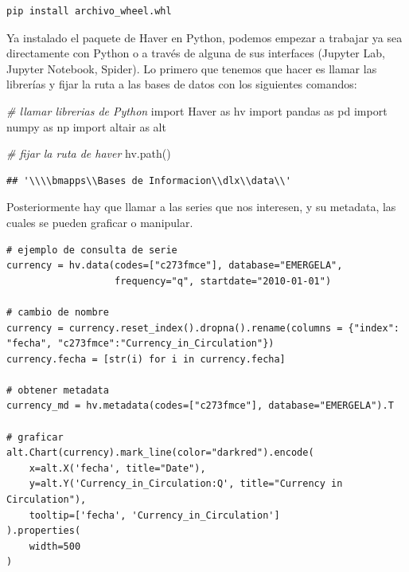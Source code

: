 \documentclass[
]{book}
\newenvironment{Shaded}{\begin{snugshade}}{\end{snugshade}}
\newcommand{\CommentTok}[1]{\textcolor[rgb]{0.56,0.35,0.01}{\textit{#1}}}
\newcommand{\ImportTok}[1]{#1}
\newcommand{\NormalTok}[1]{#1}
\begin{document}
\begin{verbatim}
pip install archivo_wheel.whl
\end{verbatim}

Ya instalado el paquete de Haver en Python, podemos empezar a trabajar ya sea directamente con Python o a través de alguna de sus interfaces (Jupyter Lab, Jupyter Notebook, Spider). Lo primero que tenemos que hacer es llamar las librerías y fijar la ruta a las bases de datos con los siguientes comandos:

\begin{Shaded}
\begin{Highlighting}[]
\CommentTok{# llamar librerias de Python}
\ImportTok{import}\NormalTok{ Haver }\ImportTok{as}\NormalTok{ hv}
\ImportTok{import}\NormalTok{ pandas }\ImportTok{as}\NormalTok{ pd}
\ImportTok{import}\NormalTok{ numpy }\ImportTok{as}\NormalTok{ np}
\ImportTok{import}\NormalTok{ altair }\ImportTok{as}\NormalTok{ alt}

\CommentTok{# fijar la ruta de haver}
\NormalTok{hv.path()}
\end{Highlighting}
\end{Shaded}

\begin{verbatim}
## '\\\\bmapps\\Bases de Informacion\\dlx\\data\\'
\end{verbatim}

Posteriormente hay que llamar a las series que nos interesen, y su metadata, las cuales se pueden graficar o manipular.

\begin{verbatim}
# ejemplo de consulta de serie
currency = hv.data(codes=["c273fmce"], database="EMERGELA", 
                   frequency="q", startdate="2010-01-01")

# cambio de nombre
currency = currency.reset_index().dropna().rename(columns = {"index": "fecha", "c273fmce":"Currency_in_Circulation"})
currency.fecha = [str(i) for i in currency.fecha]

# obtener metadata
currency_md = hv.metadata(codes=["c273fmce"], database="EMERGELA").T

# graficar
alt.Chart(currency).mark_line(color="darkred").encode(
    x=alt.X('fecha', title="Date"),
    y=alt.Y('Currency_in_Circulation:Q', title="Currency in Circulation"),
    tooltip=['fecha', 'Currency_in_Circulation']
).properties(
    width=500
)
\end{verbatim}
\end{document}
